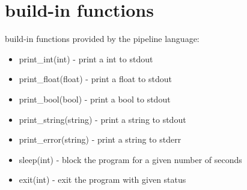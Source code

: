 \documentclass[./Report_main.tex]{subfiles}
\begin{document}
\section{build-in functions}
build-in functions provided by the pipeline language:\\
\begin{itemize}
    \item print\_int(int) - print a int to stdout
    \item print\_float(float) - print a float to stdout
    \item print\_bool(bool) - print a bool to stdout
    \item print\_string(string) - print a string to stdout
    \item print\_error(string) - print a string to stderr
    \item sleep(int) - block the program for a given number of seconds
    \item exit(int) - exit the program with given status
\end{itemize}
\end{document}
